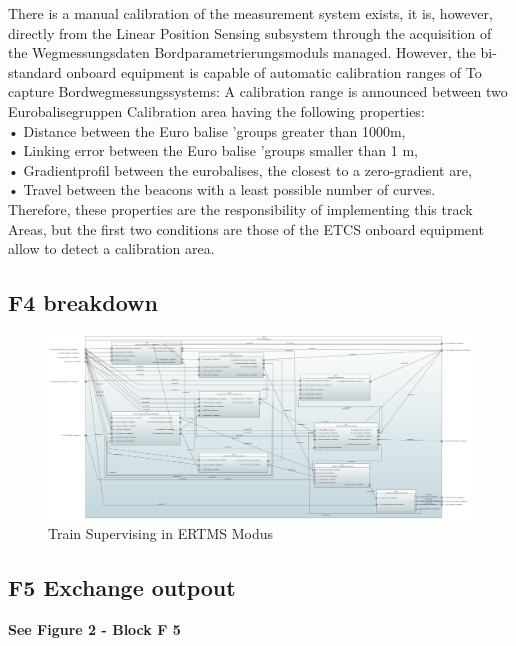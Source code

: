 \documentclass{template/openetcs_report}
\begin{document}
There is a manual calibration of the measurement system exists, it is, however, directly from the 
Linear Position Sensing subsystem through the acquisition of the Wegmessungsdaten 
Bordparametrierungsmoduls managed. 
However, the bi-standard onboard equipment is capable of automatic calibration ranges of 
To capture Bordwegmessungssystems: 
A calibration range is announced between two Eurobalisegruppen 
Calibration area having the following properties: \\
     • Distance between the Euro balise 'groups greater than 1000m, \\
     • Linking error between the Euro balise 'groups smaller than 1 m, \\
     • Gradientprofil between the eurobalises, the closest to a zero-gradient 
         are, \\
     • Travel between the beacons with a least possible number of curves. \\
Therefore, these properties are the responsibility of implementing this track 
Areas, but the first two conditions are those of the ETCS onboard equipment 
allow to detect a calibration area.\\


 \subsection{F4 breakdown}	
 \begin{figure}[hbtp]
\centering
\includegraphics [angle=90, scale=0.25] {images/F4_Breakdown}
\caption{Train Supervising in ERTMS Modus}
\end{figure}

\newpage

 \subsection{F5 Exchange outpout}

 \textbf{ See Figure 2 - Block F 5}\\
 
\end{document}
